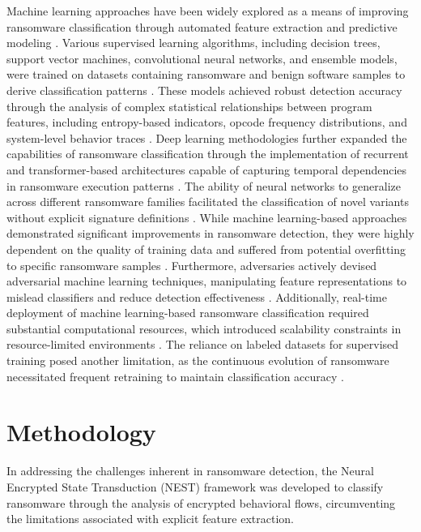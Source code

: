 \documentclass[lettersize,journal]{IEEEtran}
\begin{document}
Machine learning approaches have been widely explored as a means of improving ransomware classification through automated feature extraction and predictive modeling \cite{ limer2024automated}. Various supervised learning algorithms, including decision trees, support vector machines, convolutional neural networks, and ensemble models, were trained on datasets containing ransomware and benign software samples to derive classification patterns \cite{aguiluz2024innovative}. These models achieved robust detection accuracy through the analysis of complex statistical relationships between program features, including entropy-based indicators, opcode frequency distributions, and system-level behavior traces \cite{boughton2024dynamic}. Deep learning methodologies further expanded the capabilities of ransomware classification through the implementation of recurrent and transformer-based architectures capable of capturing temporal dependencies in ransomware execution patterns \cite{hill2024dynamic}. The ability of neural networks to generalize across different ransomware families facilitated the classification of novel variants without explicit signature definitions \cite{neghana2024dynamic}. While machine learning-based approaches demonstrated significant improvements in ransomware detection, they were highly dependent on the quality of training data and suffered from potential overfitting to specific ransomware samples \cite{gromov2024novel}. Furthermore, adversaries actively devised adversarial machine learning techniques, manipulating feature representations to mislead classifiers and reduce detection effectiveness \cite{aqazi2024hierarchical}. Additionally, real-time deployment of machine learning-based ransomware classification required substantial computational resources, which introduced scalability constraints in resource-limited environments \cite{lummen2024opcode}. The reliance on labeled datasets for supervised training posed another limitation, as the continuous evolution of ransomware necessitated frequent retraining to maintain classification accuracy \cite{ azzaman2024dynamic}. 






\section{Methodology}

In addressing the challenges inherent in ransomware detection, the Neural Encrypted State Transduction (NEST) framework was developed to classify ransomware through the analysis of encrypted behavioral flows, circumventing the limitations associated with explicit feature extraction.
\end{document}
